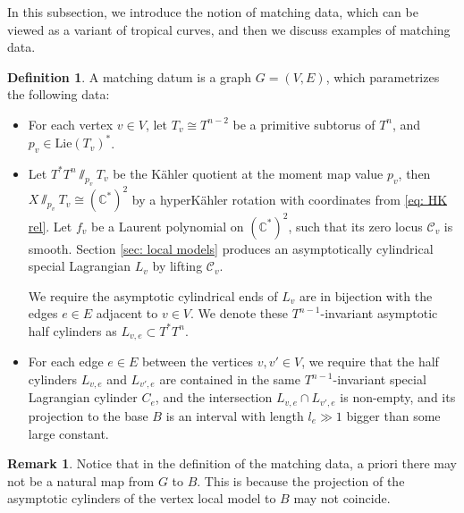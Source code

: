 \documentclass{article}
\theoremstyle{definition}
\newtheorem{rmk}{Remark}
\newtheorem{Def}[thm]{Definition}
\begin{document}
	
	In this subsection, we introduce the notion of matching data, which can be viewed as a variant of tropical curves, and then we discuss examples of matching data. 
	\begin{Def}
		A matching datum is a graph $G=(V,E)$, which parametrizes the following data: 
		\begin{itemize}
			\item For each vertex $v\in V$, let  $T_v\cong T^{n-2}$ be a primitive subtorus of $T^n$, and $p_v\in \mbox{Lie}(T_v)^*$. 
			
			
			\item Let $T^*T^n\sslash_{p_v} T_v$ be the K\"ahler quotient at the moment map value $p_v$, then $X\sslash_{p_v} T_v\cong (\mathbb{C}^*)^2$ by a hyperK\"ahler rotation with coordinates from \eqref{eq: HK rel}. Let $f_v$ be a Laurent polynomial on $(\mathbb{C}^*)^2$, such that its zero locus $\mathcal{C}_v$ is smooth. Section \ref{sec: local models} produces an asymptotically cylindrical special Lagrangian $L_v$ by lifting $\mathcal{C}_v$.        
			
			
			We require the asymptotic cylindrical ends of $L_v$ are in bijection with the edges $e\in E$ adjacent to $v\in V$. We denote these $T^{n-1}$-invariant asymptotic half cylinders as $L_{v,e}\subset T^*T^n$.
			
			
			\item For each edge $e\in E$ between the vertices $v,v'\in V$, we require that the half cylinders $L_{v,e}$ and $L_{v',e}$ are contained in the same $T^{n-1}$-invariant special Lagrangian cylinder $C_e$, and the intersection $L_{v,e}\cap L_{v',e}$ is non-empty, and its projection to the base $B$ is an interval with length $l_e\gg 1$ bigger than some large constant.   
			
		\end{itemize} 
		
	\end{Def}
	
	
	
	
	\begin{rmk}
		Notice that in the definition of the matching data, a priori there may not be a natural map from $G$ to $B$. This is because the projection of the asymptotic cylinders of the vertex local model to $B$ may not coincide. 
	\end{rmk}
	
	
	
\end{document}
